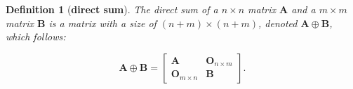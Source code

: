 \documentclass{elsarticle}
\newtheorem{definition}{\textbf{Definition} }
\begin{document}
\begin{definition}[\textbf{direct  sum}]
	The  direct  sum  of   a   $ n \times n$  matrix  $\mathbf  {A}  $ and  a   $m \times m$ matrix   $\mathbf  {B} $  is a  matrix  with a  size  of  $(n+m) \times(n+m)$,  denoted    $\mathbf  A \oplus \mathbf  B$, which  follows: 
	
	\begin{equation}
	\mathbf  {A} \oplus \mathbf  {B}=
	\left[\begin{array}{cc}
	\mathbf {A} & \mathbf {O}_{n \times m} \\
	\mathbf {O}_{m \times n} & \mathbf {B}
	\end{array}\right] .
	\end{equation}
\end{definition}





\end{document}
